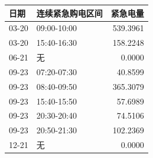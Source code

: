\begin{tabular}{llr}
\toprule
日期 & 连续紧急购电区间 & 紧急电量 \\
\midrule
03-20 & 09:00-10:00 & 539.3961 \\
03-20 & 15:40-16:30 & 158.2248 \\
06-21 & 无 & 0.0000 \\
09-23 & 07:20-07:30 & 40.8599 \\
09-23 & 08:40-09:50 & 365.3079 \\
09-23 & 15:40-15:50 & 57.6989 \\
09-23 & 20:30-20:40 & 74.5106 \\
09-23 & 20:50-21:30 & 102.2369 \\
12-21 & 无 & 0.0000 \\
\bottomrule
\end{tabular}
